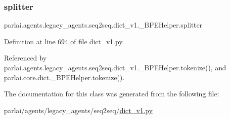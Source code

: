 \subsubsection{\texorpdfstring{splitter}{splitter}}
{\footnotesize\ttfamily parlai.\+agents.\+legacy\+\_\+agents.\+seq2seq.\+dict\+\_\+v1.\+\_\+\+B\+P\+E\+Helper.\+splitter}



Definition at line 694 of file dict\+\_\+v1.\+py.



Referenced by parlai.\+agents.\+legacy\+\_\+agents.\+seq2seq.\+dict\+\_\+v1.\+\_\+\+B\+P\+E\+Helper.\+tokenize(), and parlai.\+core.\+dict.\+\_\+\+B\+P\+E\+Helper.\+tokenize().



The documentation for this class was generated from the following file\+:\begin{DoxyCompactItemize}
\item 
parlai/agents/legacy\+\_\+agents/seq2seq/\hyperlink{dict__v1_8py}{dict\+\_\+v1.\+py}\end{DoxyCompactItemize}
